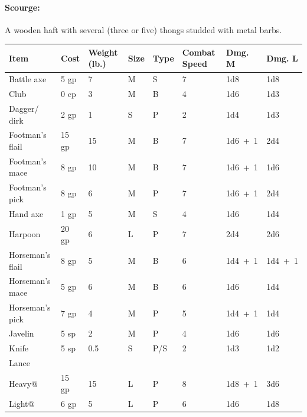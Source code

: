 \begin{multicols}{2}
\paragraph{Scourge:} A wooden haft with several (three or five) thongs studded with metal barbs.

\end{multicols}

\noindent
\begin{minipage}{\textwidth}

\label{meleeweapons}
\noindent
\begin{tabular}{|p{}|p{}|p{}|p{}|p{}|p{}|p{}|p{}|}
\hline
Item	& Cost	& Weight (lb.)	& Size	& Type	& Combat Speed	& Dmg. M	& Dmg. L \\
\hline\hline
\rowcolor[gray]{.9}Battle axe			& 5 gp	& 7		& M	& S		& 7		& 1d8	& 1d8 \\
Club				& 0 cp	& 3		& M	& B		& 4		& 1d6	& 1d3 \\
\rowcolor[gray]{.9}Dagger/ dirk		& 2 gp	& 1		& S	& P		& 2		& 1d4	& 1d3 \\
Footman's flail		& 15 gp	& 15	& M	& B		& 7		& 1d6~+~1	& 2d4 \\
\rowcolor[gray]{.9}Footman's mace		& 8 gp	& 10	& M	& B		& 7		& 1d6~+~1	& 1d6 \\
Footman's pick		& 8 gp	& 6		& M	& P		& 7		& 1d6~+~1	& 2d4 \\
\rowcolor[gray]{.9}Hand axe			& 1 gp	& 5		& M	& S		& 4		& 1d6	& 1d4 \\
Harpoon				& 20 gp	& 6		& L	& P		& 7		& 2d4	& 2d6 \\
\rowcolor[gray]{.9}Horseman's flail	& 8 gp	& 5		& M	& B		& 6		& 1d4~+~1	& 1d4~+~1 \\
Horseman's mace		& 5 gp	& 6		& M	& B		& 6		& 1d6	& 1d4 \\
\rowcolor[gray]{.9}Horseman's pick		& 7 gp	& 4		& M	& P		& 5		& 1d4~+~1	& 1d4 \\
Javelin				& 5 sp	& 2		& M	& P		& 4		& 1d6	& 1d6 \\
\rowcolor[gray]{.9}Knife				& 5 sp	& 0.5	& S	& P/S	& 2		& 1d3	& 1d2 \\
Lance				& 	& 	& 	& 	& 	& 	& \\
\hspace{1em}Heavy@			& 15 gp	& 15	& L	& P		& 8		& 1d8~+~1	& 3d6 \\
\rowcolor[gray]{.9}\hspace{1em}Light@			& 6 gp	& 5		& L	& P		& 6		& 1d6	& 1d8 \\

\end{tabular}
\end{minipage}
